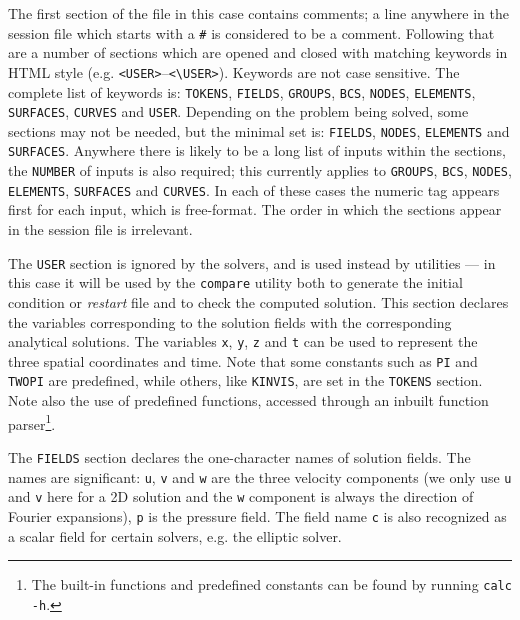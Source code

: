 \documentclass[11pt]{report}
\begin{document}
The first section of the file in this case contains comments; a line
anywhere in the session file which starts with a \verb+#+ is
considered to be a comment.  Following that are a number of sections
which are opened and closed with matching keywords in HTML style (e.g.
\verb+<USER>+--\verb+<\USER>+).  Keywords are not case sensitive.
The complete list of keywords is: \texttt{TOKENS}, \texttt{FIELDS}, 
\texttt{GROUPS}, \texttt{BCS}, \texttt{NODES}, \texttt{ELEMENTS}, 
\texttt{SURFACES}, \texttt{CURVES} and \texttt{USER}.  Depending on the
problem being solved, some sections may not be needed, but the minimal
set is: \texttt{FIELDS}, \texttt{NODES}, \texttt{ELEMENTS} and
\texttt{SURFACES}.  Anywhere there is likely to be a long list of
inputs within the sections, the \texttt{NUMBER} of inputs is also
required; this currently applies to \texttt{GROUPS}, \texttt{BCS},
\texttt{NODES}, \texttt{ELEMENTS}, \texttt{SURFACES} and
\texttt{CURVES}.  In each of these cases the numeric tag appears first for
each input, which is free-format.  The order in which the sections
appear in the session file is irrelevant.

The \texttt{USER} section is ignored by the solvers, and is used
instead by utilities --- in this case it will be used by the
\texttt{compare} utility both to generate the initial condition or
\emph{restart} file and to check the computed solution.  This
section declares the variables corresponding to the solution fields
with the corresponding analytical solutions.  The variables
\texttt{x}, \texttt{y}, \texttt{z} and \texttt{t} can be used to
represent the three spatial coordinates and time.  Note that some
constants such as \texttt{PI} and \texttt{TWOPI} are predefined, while
others, like \texttt{KINVIS}, are set in the \texttt{TOKENS} section.
Note also the use of predefined functions, accessed through an inbuilt
function parser\footnote{The built-in functions and predefined constants
can be found by running \texttt{calc -h}.}.

The \texttt{FIELDS} section declares the one-character names of
solution fields.  The names are significant: \texttt{u}, \texttt{v}
and \texttt{w} are the three velocity components (we only use
\texttt{u} and \texttt{v} here for a 2D solution and the \texttt{w}
component is always the direction of Fourier expansions), \texttt{p}
is the pressure field.  The field name \texttt{c} is also recognized
as a scalar field for certain solvers, e.g. the elliptic solver.
\end{document}

